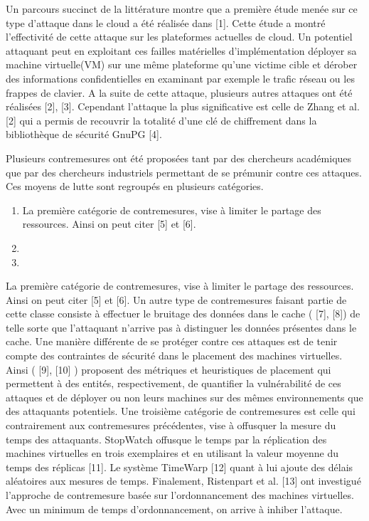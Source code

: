 Un parcours succinct de la littérature montre que a première étude menée  sur ce type d’attaque dans le cloud a été réalisée dans [1]. Cette étude a montré l’effectivité de cette attaque sur les plateformes actuelles de cloud.  Un potentiel attaquant peut  en exploitant ces  failles matérielles d’implémentation  déployer sa machine virtuelle(VM) sur une même plateforme qu’une victime cible et dérober des informations confidentielles en examinant par exemple le trafic réseau ou les frappes de clavier. A la suite de cette attaque, plusieurs autres attaques ont été réalisées [2], [3]. Cependant  l’attaque la plus significative  est celle de Zhang et al. [2] qui a permis de recouvrir la totalité d’une clé de chiffrement dans la bibliothèque de sécurité GnuPG [4].
\par 
Plusieurs  contremesures ont été proposées tant par des chercheurs académiques que par  des chercheurs industriels permettant de se prémunir contre ces attaques. Ces moyens de lutte  sont regroupés en plusieurs catégories. 
\begin{enumerate}
 \item La première catégorie de contremesures, vise à   limiter le partage des ressources.  Ainsi on peut citer [5] et [6].
 \item 
 \item                  
\end{enumerate}
La première catégorie de contremesures, vise à   limiter le partage des ressources.  Ainsi on peut citer [5] et [6].  Un autre type de contremesures  faisant partie de cette classe consiste à effectuer  le bruitage des données dans  le cache ( [7], [8]) de telle sorte que l’attaquant n’arrive pas à distinguer les données présentes dans le cache. Une manière différente de se protéger contre ces attaques est  de tenir compte des contraintes  de sécurité dans le placement  des machines virtuelles. Ainsi ( [9], [10] ) proposent des métriques et heuristiques de placement  qui permettent à des entités, respectivement, de quantifier la vulnérabilité de ces attaques et de  déployer ou  non  leurs machines sur des mêmes environnements  que des attaquants potentiels. 
Une troisième catégorie de contremesures est celle qui contrairement aux contremesures précédentes,  vise à offusquer la mesure du temps des attaquants. StopWatch  offusque le temps par la réplication des  machines virtuelles  en trois exemplaires  et en  utilisant   la valeur moyenne du temps des réplicas [11]. Le système TimeWarp [12] quant à lui ajoute des délais aléatoires aux mesures de temps. 
Finalement, Ristenpart et al. [13] ont investigué l’approche de contremesure basée sur l’ordonnancement des machines virtuelles.  Avec un minimum de temps d’ordonnancement, on arrive à inhiber l’attaque.



